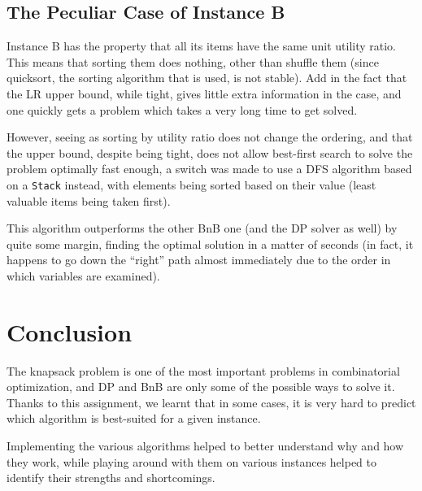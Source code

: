 \documentclass[journal]{IEEEtran}
\newcommand{\scala}[1]{\texttt{#1}}
\begin{document}
\subsection{The Peculiar Case of Instance B}
Instance B has the property that all its items have the same unit utility ratio.
This means that sorting them does nothing, other than shuffle them (since quicksort, the sorting algorithm that is used, is not stable).
Add in the fact that the LR upper bound, while tight, gives little extra information in the case, and one quickly gets a problem which takes a very long time to get solved.

However, seeing as sorting by utility ratio does not change the ordering, and that the upper bound, despite being tight, does not allow best-first search to solve the problem optimally fast enough, a switch was made to use a DFS algorithm based on a \scala{Stack} instead, with elements being sorted based on their value (least valuable items being taken first).

This algorithm outperforms the other BnB one (and the DP solver as well) by quite some margin, finding the optimal solution in a matter of seconds (in fact, it happens to go down the ``right'' path almost immediately due to the order in which variables are examined).

\section{Conclusion}
The knapsack problem is one of the most important problems in combinatorial optimization, and DP and BnB are only some of the possible ways to solve it.
Thanks to this assignment, we learnt that in some cases, it is very hard to predict which algorithm is best-suited for a given instance.

Implementing the various algorithms helped to better understand why and how they work, while playing around with them on various instances helped to identify their strengths and shortcomings.
\end{document}
